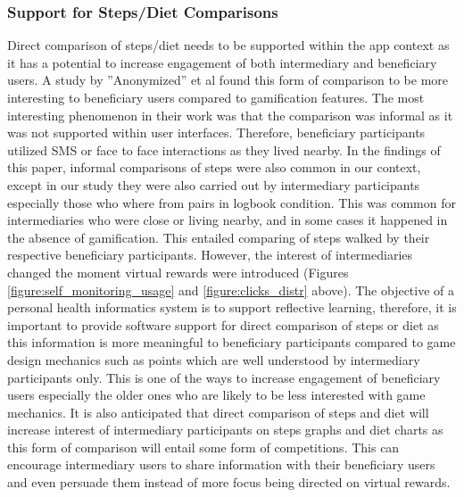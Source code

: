 \documentclass{sig-alternate}
\begin{document}
\subsubsection*{\textbf{Support for Steps/Diet Comparisons}}
Direct comparison of steps/diet needs to be supported within the app context as it has a potential to increase engagement of both intermediary and beneficiary users. A study by ''Anonymized'' et al \cite{katule2016:leveraging} found this form of comparison to be more interesting to beneficiary users compared to gamification features. The most interesting phenomenon in their work was that the comparison was informal as it was not supported within user interfaces. Therefore, beneficiary participants utilized SMS or face to face interactions as they lived nearby.\newline
In the findings of this paper, informal comparisons of steps were also common in our context, except in our study they were also carried out by intermediary participants especially those who where from pairs in logbook condition. This was common for intermediaries who were close or living nearby, and in some cases it happened in the absence of gamification. This entailed comparing of steps walked by their respective beneficiary participants. However, the interest of intermediaries changed the moment virtual rewards were introduced (Figures \ref{figure:self_monitoring_usage} and \ref{figure:clicks_distr} above). The objective of a personal health informatics system is to support reflective learning, therefore, it is important to provide software support for direct comparison of steps or diet as this information is more meaningful to beneficiary participants compared to game design mechanics such as points which are well understood by intermediary participants only. This is one of the ways to increase engagement of beneficiary users especially the older ones who are likely to be less interested with game mechanics. It is also anticipated that direct comparison of steps and diet will increase interest of intermediary participants on steps graphs and diet charts as this form of comparison will entail some form of competitions. This can encourage intermediary users to share information with their beneficiary users and even persuade them instead of more focus being directed on virtual rewards.
\end{document}
